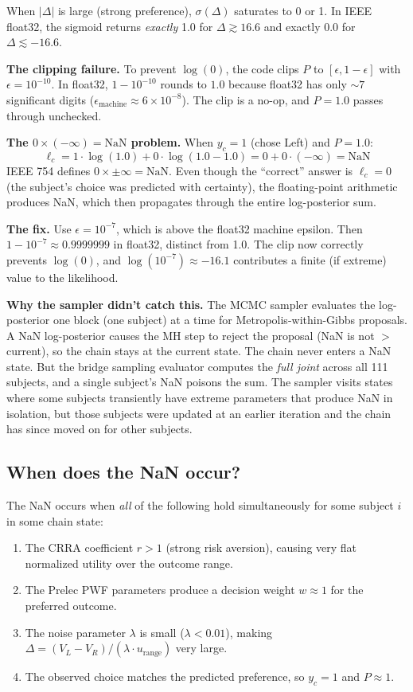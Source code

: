 \documentclass[11pt]{article}
\theoremstyle{plain}
\theoremstyle{definition}
\begin{document}
When $|\Delta|$ is large (strong preference), $\sigma(\Delta)$ saturates to 0
or 1. In IEEE float32, the sigmoid returns \textit{exactly} 1.0 for
$\Delta \gtrsim 16.6$ and exactly 0.0 for $\Delta \lesssim -16.6$.

\textbf{The clipping failure.} To prevent $\log(0)$, the code clips
$P$ to $[\epsilon, 1 - \epsilon]$ with $\epsilon = 10^{-10}$.
In float32, $1 - 10^{-10}$ rounds to $1.0$ because float32 has only
$\sim 7$ significant digits ($\epsilon_{\text{machine}} \approx 6 \times
10^{-8}$). The clip is a no-op, and $P = 1.0$ passes through unchecked.

\textbf{The $0 \times (-\infty) = \text{NaN}$ problem.} When $y_c = 1$ (chose
Left) and $P = 1.0$:
\[
  \ell_c = 1 \cdot \log(1.0) + 0 \cdot \log(1.0 - 1.0) = 0 + 0 \cdot (-\infty) = \text{NaN}
\]
IEEE 754 defines $0 \times \pm\infty = \text{NaN}$. Even though the ``correct''
answer is $\ell_c = 0$ (the subject's choice was predicted with certainty), the
floating-point arithmetic produces NaN, which then propagates through the
entire log-posterior sum.

\textbf{The fix.} Use $\epsilon = 10^{-7}$, which is above the float32 machine
epsilon. Then $1 - 10^{-7} \approx 0.9999999$ in float32, distinct from 1.0.
The clip now correctly prevents $\log(0)$, and $\log(10^{-7}) \approx -16.1$
contributes a finite (if extreme) value to the likelihood.

\textbf{Why the sampler didn't catch this.} The MCMC sampler evaluates the
log-posterior one block (one subject) at a time for Metropolis-within-Gibbs
proposals. A NaN log-posterior causes the MH step to reject the proposal
(NaN is not $>$ current), so the chain stays at the current state. The chain
never enters a NaN state. But the bridge sampling evaluator computes the
\textit{full joint} across all 111 subjects, and a single subject's NaN
poisons the sum. The sampler visits states where some subjects transiently
have extreme parameters that produce NaN in isolation, but those subjects
were updated at an earlier iteration and the chain has since moved on for
other subjects.

\subsection{When does the NaN occur?}

The NaN occurs when \textit{all} of the following hold simultaneously for
some subject $i$ in some chain state:

\begin{enumerate}
  \item The CRRA coefficient $r > 1$ (strong risk aversion), causing very flat
    normalized utility over the outcome range.
  \item The Prelec PWF parameters produce a decision weight $w \approx 1$
    for the preferred outcome.
  \item The noise parameter $\lambda$ is small ($\lambda < 0.01$), making
    $\Delta = (V_L - V_R) / (\lambda \cdot u_{\text{range}})$ very large.
  \item The observed choice matches the predicted preference, so $y_c = 1$
    and $P \approx 1$.
\end{enumerate}
\end{document}
